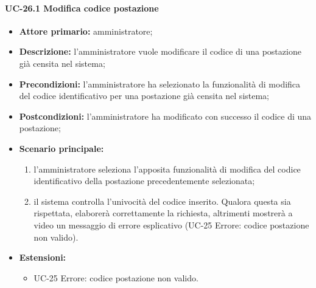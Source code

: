 \paragraph{UC-26.1 Modifica codice postazione}
  \begin{itemize}
	\item \textbf{Attore primario:} amministratore;
	\item \textbf{Descrizione:} l'amministratore vuole modificare il codice di una postazione già censita nel sistema;
	\item \textbf{Precondizioni:} l'amministratore ha selezionato la funzionalità di modifica del codice identificativo per una postazione già censita nel sistema;
	\item \textbf{Postcondizioni:} l'amministratore ha modificato con successo il codice di una postazione;
	\item \textbf{Scenario principale:}
	      \begin{enumerate}
		      \item l'amministratore seleziona l'apposita funzionalità di modifica del codice identificativo della postazione precedentemente selezionata;
		      \item il sistema controlla l'univocità del codice inserito. Qualora questa sia rispettata, elaborerà correttamente la richiesta, altrimenti mostrerà a video un messaggio di errore esplicativo (UC-25 Errore: codice postazione non valido).
	      \end{enumerate}
	\item \textbf{Estensioni:}
		\begin{itemize}
		      \item UC-25 Errore: codice postazione non valido.
	      \end{itemize}
\end{itemize}

    
